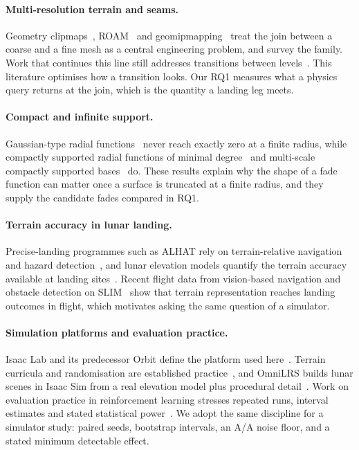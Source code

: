 
\paragraph{Multi-resolution terrain and seams.}
Geometry clipmaps~\cite{losasso2004}, ROAM~\cite{duchaineau1997} and geomipmapping~\cite{deboer2000} treat the join between a coarse and a fine mesh as a central engineering problem, and \citet{pajarola2007} survey the family. Work that continues this line still addresses transitions between levels~\cite{zhang2019,jain2024}. This literature optimises how a transition looks. Our RQ1 measures what a physics query returns at the join, which is the quantity a landing leg meets.

\paragraph{Compact and infinite support.}
Gaussian-type radial functions~\cite{hardy1971} never reach exactly zero at a finite radius, while compactly supported radial functions of minimal degree~\cite{wendland1995} and multi-scale compactly supported bases~\cite{ohtake2003,ohtake2003mpu} do. These results explain why the shape of a fade function can matter once a surface is truncated at a finite radius, and they supply the candidate fades compared in RQ1.

\paragraph{Terrain accuracy in lunar landing.}
Precise-landing programmes such as ALHAT rely on terrain-relative navigation and hazard detection~\cite{johnson2008,nasajpl}, and lunar elevation models quantify the terrain accuracy available at landing sites~\cite{barker2016}. Recent flight data from vision-based navigation and obstacle detection on SLIM~\cite{ishida2025} show that terrain representation reaches landing outcomes in flight, which motivates asking the same question of a simulator.

\paragraph{Simulation platforms and evaluation practice.}
Isaac Lab and its predecessor Orbit define the platform used here~\cite{mittal2023,nvidia2025}. Terrain curricula and randomisation are established practice~\cite{rudin2022,tobin2017}, and OmniLRS builds lunar scenes in Isaac Sim from a real elevation model plus procedural detail~\cite{richard2024}. Work on evaluation practice in reinforcement learning stresses repeated runs, interval estimates and stated statistical power~\cite{henderson2018,agarwal2021,colas2018,colas2019}. We adopt the same discipline for a simulator study: paired seeds, bootstrap intervals, an A/A noise floor, and a stated minimum detectable effect.

